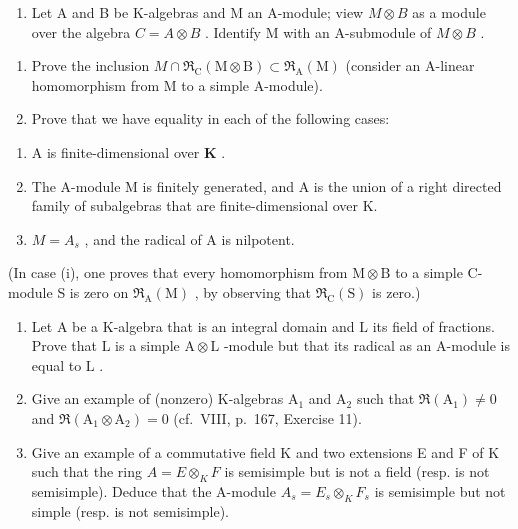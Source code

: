 
\begin{enumerate}
\def\labelenumi{\arabic{enumi})}
\tightlist
\item
  Let A and B be K-algebras and M an A-module; view \(M \otimes B\) as a module over the algebra \(C = A \otimes B\) . Identify M with an A-submodule of \(M \otimes B\) .
\end{enumerate}

\begin{enumerate}
\def\labelenumi{\alph{enumi})}
\item
  Prove the inclusion \(M \cap \mathfrak{R}_{\mathrm{C}}(\mathrm{M} \otimes \mathrm{B}) \subset \mathfrak{R}_{\mathrm{A}}(\mathrm{M})\) (consider an A-linear homomorphism from M to a simple A-module).
\item
  Prove that we have equality in each of the following cases:
\end{enumerate}

\begin{enumerate}
\def\labelenumi{(\roman{enumi})}
\item
  A is finite-dimensional over \(\mathbf{K}\) .
\item
  The A-module M is finitely generated, and A is the union of a right directed family of subalgebras that are finite-dimensional over K.
\item
  \(M = A_{s}\) , and the radical of A is nilpotent.
\end{enumerate}

(In case (i), one proves that every homomorphism from \(\mathrm{M} \otimes \mathrm{B}\) to a simple C-module S is zero on \(\Re_{\mathrm{A}}(\mathrm{M})\) , by observing that \(\Re_{\mathrm{C}}(\mathrm{S})\) is zero.)

\begin{enumerate}
\def\labelenumi{\arabic{enumi})}
\setcounter{enumi}{1}
\item
  Let \(\mathrm{A}\) be a K-algebra that is an integral domain and \(\mathrm{L}\) its field of fractions. Prove that \(\mathrm{L}\) is a simple \(\mathrm{A} \otimes \mathrm{L}\) -module but that its radical as an A-module is equal to \(\mathrm{L}\) .
\item
  Give an example of (nonzero) K-algebras \(\mathrm{A}_1\) and \(\mathrm{A}_2\) such that \(\Re (\mathrm{A}_1)\neq 0\) and \(\Re (\mathrm{A}_1\otimes \mathrm{A}_2) = 0\) (cf.~VIII, p.~167, Exercise 11).
\item
  Give an example of a commutative field K and two extensions E and F of K such that the ring \(A = E \otimes_{K} F\) is semisimple but is not a field (resp. is not semisimple). Deduce that the A-module \(A_{s} = E_{s} \otimes_{K} F_{s}\) is semisimple but not simple (resp. is not semisimple).
\end{enumerate}

